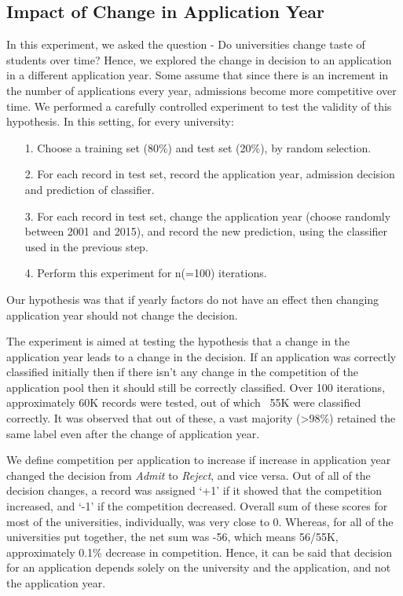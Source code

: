 \documentclass{sig-alternate-05-2015}
\begin{document}
\subsection{Impact of Change in Application Year}
\label{subsec:year-change-exp}
In this experiment, we asked the question - Do universities change taste of students over time? Hence, we explored the change in decision to an application in a different application year. Some assume that since there is an increment in the number of applications every year, admissions become more competitive over time. We performed a carefully controlled experiment to test the validity of this hypothesis. In this setting, for every university:
\begin{itemize}
\item[1.]Choose a training set (80\%) and test set (20\%), by random selection.
\item[2.]For each record in test set, record the application year, admission decision and prediction of classifier.
\item[3.]For each record in test set, change the application year (choose randomly between 2001 and 2015), and record the new prediction, using the classifier used in the previous step.
\item[4.]Perform this experiment for n(=100) iterations.
\end{itemize}
Our hypothesis was that if yearly factors do not have an effect then changing application year should not change the decision.

The experiment is aimed at testing the hypothesis that a change in the application year leads to a change in the decision. If an application was correctly classified initially then if there isn't any change in the competition of the application pool then it should still be correctly classified. Over 100 iterations, approximately 60K records were tested, out of which ~55K were classified correctly. It was observed that out of these, a vast majority (>98\%) retained the same label even after the change of application year.

We define competition per application to increase if increase in application year changed the decision from \textit{Admit} to \textit{Reject}, and vice versa. Out of all of the decision changes, a record was assigned `+1' if it showed that the competition increased, and `-1' if the competition decreased. Overall sum of these scores for most of the universities, individually, was very close to 0. Whereas, for all of the universities put together, the net sum was -56, which means 56/55K, approximately 0.1\% decrease in competition. Hence, it can be said that decision for an application depends solely on the university and the application, and not the application year.\\
\end{document}
